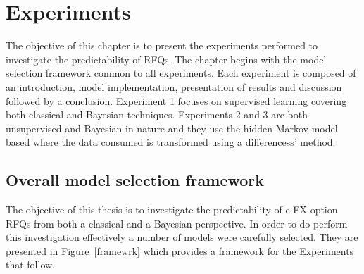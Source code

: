 \chapter{Experiments}\label{ch4:title}
\begin{singlespacing}
\begin{microabstract}
    The objective of this chapter is to present the experiments performed to investigate the predictability of RFQs. The chapter begins with the model selection framework common to all experiments. Each experiment is composed of an introduction, model implementation, presentation of results and discussion followed by a conclusion. Experiment 1 focuses on supervised learning covering both classical and Bayesian techniques. Experiments 2 and 3 are both unsupervised and Bayesian in nature and they use the hidden Markov model based where the data consumed is transformed using a differencess' method.
    
\end{microabstract}
\end{singlespacing}
\section{Overall model selection framework}

The objective of this thesis is to investigate the predictability of e-FX option RFQs from both a classical and a Bayesian perspective. In order to do perform this investigation effectively a number of models were carefully selected. They are presented in Figure~\ref{framewrk} which provides a framework for the Experiments that follow.


